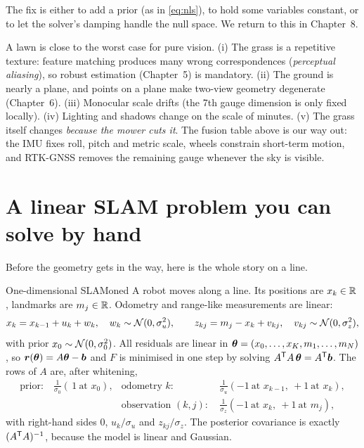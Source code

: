 The fix is either to add a prior (as in \eqref{eq:nls}), to hold some
variables constant, or to let the solver's damping handle the null space.
We return to this in Chapter~8.

\begin{mower}
A lawn is close to the worst case for pure vision. (i) The grass is a
repetitive texture: feature matching produces many wrong correspondences
(\emph{perceptual aliasing}), so robust estimation (Chapter~5) is
mandatory. (ii) The ground is nearly a plane, and points on a plane make
two-view geometry degenerate (Chapter~6). (iii) Monocular scale drifts
(the 7th gauge dimension is only fixed locally). (iv) Lighting and
shadows change on the scale of minutes. (v) The grass itself changes
\emph{because the mower cuts it}. The fusion table above is our way out:
the IMU fixes roll, pitch and metric scale, wheels constrain short-term
motion, and RTK-GNSS removes the remaining gauge whenever the sky is
visible.
\end{mower}

\section{A linear SLAM problem you can solve by hand}
\label{sec:linear}

Before the geometry gets in the way, here is the whole story on a line.

\begin{example}{One-dimensional SLAM}{oned}
A robot moves along a line. Its positions are $x_k\in\mathbb{R}$, landmarks are
$m_j\in\mathbb{R}$. Odometry and range-like measurements are linear:
\[
x_k=x_{k-1}+u_k+w_k,\quad w_k\sim\mathcal{N}(0,\sigma_u^2),\qquad
z_{kj}=m_j-x_k+v_{kj},\quad v_{kj}\sim\mathcal{N}(0,\sigma_z^2),
\]
with prior $x_0\sim\mathcal{N}(0,\sigma_0^2)$. All residuals are linear in
$\bm{\theta}=(x_0,\dots,x_K,m_1,\dots,m_N)$, so $\bm{r}(\bm{\theta})=A\bm{\theta}-
\bm{b}$ and $F$ is minimised in one step by solving
$A^{\mathsf{T}} A\,\bm{\theta}=A^{\mathsf{T}}\bm{b}$. The rows of $A$ are, after whitening,
\begin{align*}
\text{prior:}&\ \tfrac1{\sigma_0}(\,1\ \text{at }x_0),
&\text{odometry }k:&\ \tfrac1{\sigma_u}(-1\ \text{at }x_{k-1},\
  +1\ \text{at }x_k),\\
&&\text{observation }(k,j):&\ \tfrac1{\sigma_z}(-1\ \text{at }x_k,\
  +1\ \text{at }m_j),
\end{align*}
with right-hand sides $0$, $u_k/\sigma_u$ and $z_{kj}/\sigma_z$.
The posterior covariance is exactly $(A^{\mathsf{T}} A)^{-1}$, because the model is
linear and Gaussian.
\end{example}

